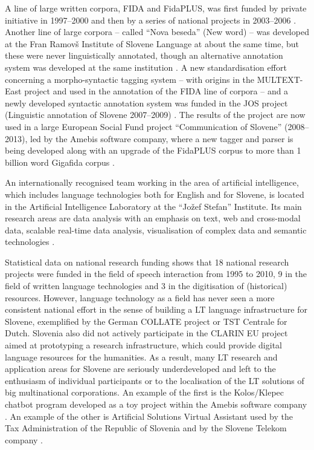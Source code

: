 \begin{multicols}{2}
A line of large written corpora, FIDA and FidaPLUS, was first funded by private initiative in 1997--2000 and then by a series of national projects in 2003--2006 \cite{Fida1}. Another line of large corpora – called ``Nova beseda'' (New word) – was developed at the Fran Ramovš Institute of Slovene Language at about the same time, but these were never linguistically annotated, though an alternative annotation system was developed at the same institution \cite{NB1}.  A new standardisation effort concerning a morpho-syntactic tagging system – with origins in the MULTEXT-East project and used in the annotation of the FIDA line of corpora – and a newly developed syntactic annotation system was funded in the JOS project (Linguistic annotation of Slovene 2007--2009) \cite{JOS1}. The results of the project are now used in a large European Social Fund project ``Communication of Slovene'' (2008--2013), led by the Amebis software company, where a new tagger and parser is being developed along with an upgrade of the FidaPLUS corpus to more than 1 billion word Gigafida corpus \cite{Slo1}. 

An internationally recognised team working in the area of artificial intelligence, which includes language technologies both for English and for Slovene, is located in the Artificial Intelligence Laboratory at the “Jožef Stefan” Institute. Its main research areas are data analysis with an emphasis on text, web and cross-modal data, scalable real-time data analysis, visualisation of complex data and semantic technologies \cite{Ailab1}.

Statistical data on national research funding shows that 18 national research projects were funded in the field of speech interaction from 1995 to 2010, 9 in the field of written language technologies and 3 in the digitisation of (historical) resources. However, language technology as a field has never seen a more consistent national effort in the sense of building a LT language infrastructure for Slovene, exemplified by the German COLLATE project or TST Centrale for Dutch. Slovenia also did not actively participate in the CLARIN EU project aimed at prototyping a research infrastructure, which could provide digital language resources for the humanities. As a result, many LT research and application areas for Slovene are seriously underdeveloped and left to the enthusiasm of individual participants or to the localisation of the LT solutions of big multinational corporations. An example of the first is the Kolos/Klepec chatbot program developed as a toy project within the Amebis software company \cite{Amb7}.  An example of the other is Artificial Solutions Virtual Assistant used by the Tax Administration of the Republic of Slovenia and by the Slovene Telekom company \cite{Chat1}. 


\end{multicols}
